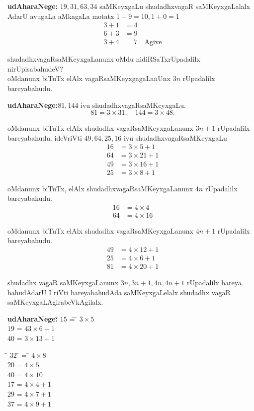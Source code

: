 \textbf{udAharaNege:} $19,31,63,34$ saMKeyxgaLu shudadhxvagaR saMKeyxgaLalalx AdarU avugaLa aMkagaLa motatx $1+9=10, 1+0=1$
\begin{align*}
3+1&=4\\
6+3&=9\\
3+4&=7 \quad \text{Agive}
\end{align*}

shudadhxvagaRsaMKeyxgaLanunx oMdu nidiRSaTxrUpadalilx nirUpisabahudeV?\\
oMdanunx biTuTx elAlx vagaRsaMKeyxgagaLanUnx $3n$ rUpadalilx bareyabahudu.

\textbf{udAharaNege:}\quad  $81,144$ ivu shudadhxvagaRsaMKeyxgaLu.
$$
81 =3\times 31, \quad  144 = 3\times 48.
$$

oMdanunx biTuTx elAlx shudadhx vagaRsaMKeyxgaLanunx $ 3n+1$ rUpadalilx bareyabahudu.
ideVriVti $49,64,25,16$ ivu shudadhxvagaRsaMKeyxgaLu
\begin{align*}
16&=3\times 5+1\\
64&=3\times 21+1\\
49&=3\times 16+1\\
25&=3\times 8+1
\end{align*}

oMdanunx biTuTx, elAlx shudadhxvagaRsaMKeyxgaLanunx $4n$ rUpadalilx bareyabahudu.
\begin{align*}
16&= 4\times 4\\
64&= 4\times 16
\end{align*}

oMdanunx biTuTx elAlx shudadhx vagaRsaMKeyxgaLanunx $4n+1$ rUpadalilx bareyabahudu.
\begin{align*}
49 &=4\times 12+1\\
25 &=4\times 6+1\\
81 &=4\times 20+1 
\end{align*}

shudadhx vagaR saMKeyxgaLanunx $3n,3n+1, 4n, 4n+1$ rUpadalilx bareya bahudAdarU I riVti bareyabahudAda saMKeyxgaLelalx shudadhx vagaR saMKeyxgaLAgirabeVkAgilalx.

\begin{tabbing}
\textbf{udAharaNege:}\quad\;\;\=\;\; $15$ \= = \= $3\times 5$\\
 \> \;\; $19$ \> = \> $43\times 6+1$\\
 \> \;\; $40$ \> = \> $3\times 13+1$ 
\end{tabbing}                 
\begin{tabbing}
\qquad\;\;\=\;\; $32$ \=\; = \= $4\times 8$\\
\> \;\; $20$ \>\; = \> $4\times 5$\\
\> \;\; $40$ \>\; = \> $4\times 10$\\
\> \;\; $17$ \>\; = \> $4\times 4+1$\\
\> \;\; $29$ \>\; = \> $4\times 7+1$\\
\> \;\; $37$ \>\; = \> $4\times 9+1$
\end{tabbing}

